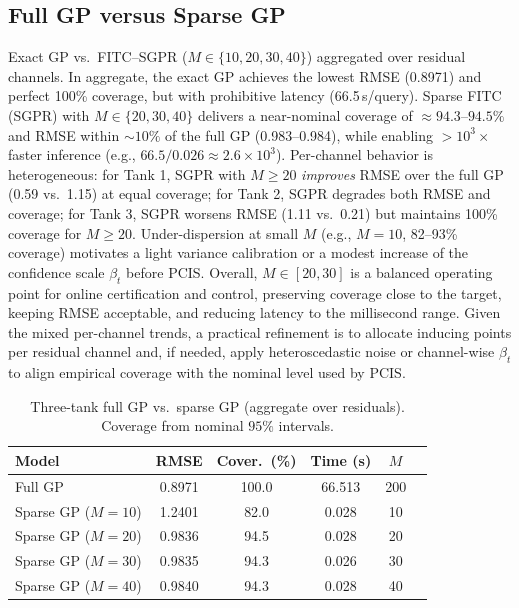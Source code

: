 \documentclass[10pt]{article}
\newcommand{\1}{\mathbbm{1}}
\begin{document}
\subsection{Full GP versus Sparse GP}\label{subsec:tank_full_vs_sparse}
Exact GP  vs.\ FITC–SGPR ($M{\in}\{10,20,30,40\}$) aggregated over residual channels.
In aggregate, the exact GP achieves the lowest RMSE (0.8971) and perfect 100\% coverage, but with prohibitive latency (66.5\,s/query). Sparse FITC (SGPR) with \(M\in\{20,30,40\}\) delivers a near-nominal coverage of \(\approx 94.3\text{--}94.5\%\) and RMSE within \(\sim 10\%\) of the full GP (0.983–0.984), while enabling \(>10^3\times\) faster inference (e.g., \(66.5/0.026 \!\approx\! 2.6\times 10^3\)). Per-channel behavior is heterogeneous: for Tank 1, SGPR with \(M\ge 20\) \emph{improves} RMSE over the full GP (0.59 vs.\ 1.15) at equal coverage; for Tank 2, SGPR degrades both RMSE and coverage; for Tank 3, SGPR worsens RMSE (1.11 vs.\ 0.21) but maintains 100\% coverage for \(M\ge 20\). Under-dispersion at small \(M\) (e.g., \(M{=}10\), 82–93\% coverage) motivates a light variance calibration or a modest increase of the confidence scale \(\beta_t\) before PCIS. Overall, \(M\in[20,30]\) is a balanced operating point for online certification and control, preserving coverage close to the target, keeping RMSE acceptable, and reducing latency to the millisecond range. Given the mixed per-channel trends, a practical refinement is to allocate inducing points per residual channel and, if needed, apply heteroscedastic noise or channel-wise \(\beta_t\) to align empirical coverage with the nominal level used by PCIS.

\begin{table}[ht]
\centering
\caption{Three-tank full GP vs.\ sparse GP (aggregate over residuals). Coverage from nominal $95\%$ intervals.}
\label{tab:wt_sgpr_agg}
\setlength{\tabcolsep}{2pt}
\begin{tabular}{lccccr}
\toprule
Model & RMSE &  Cover.\ (\%) & Time (s) & $M$\\
\midrule
Full GP              & 0.8971  & 100.0 & 66.513 & 200\\
Sparse GP ($M{=}10$) & 1.2401  & 82.0  & 0.028  & 10\\
Sparse GP ($M{=}20$) & 0.9836  & 94.5  & 0.028  & 20\\
Sparse GP ($M{=}30$) & 0.9835  & 94.3  & 0.026  & 30\\
Sparse GP ($M{=}40$) & 0.9840  & 94.3  & 0.028  & 40\\
\bottomrule
\end{tabular}
\end{table}
\end{document}
